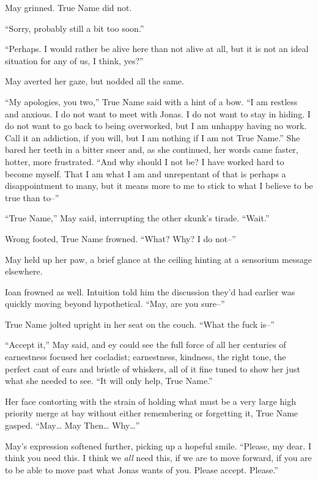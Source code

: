 May grinned. True Name did not.

``Sorry, probably still a bit too soon.''

``Perhaps. I would rather be alive here than not alive at all, but it is not an ideal situation for any of us, I think, yes?''

May averted her gaze, but nodded all the same.

``My apologies, you two,'' True Name said with a hint of a bow. ``I am restless and anxious. I do not want to meet with Jonas. I do not want to stay in hiding. I do not want to go back to being overworked, but I am unhappy having no work. Call it an addiction, if you will, but I am nothing if I am not True Name.'' She bared her teeth in a bitter sneer and, as she continued, her words came faster, hotter, more frustrated. ``And why should I not be? I have worked hard to become myself. That I am what I am and unrepentant of that is perhaps a disappointment to many, but it means more to me to stick to what I believe to be true than to--''

``True Name,'' May said, interrupting the other skunk's tirade. ``Wait.''

Wrong footed, True Name frowned. ``What? Why? I do not--''

May held up her paw, a brief glance at the ceiling hinting at a sensorium message elsewhere.

Ioan frowned as well. Intuition told him the discussion they'd had earlier was quickly moving beyond hypothetical. ``May, are you sure--''

True Name jolted upright in her seat on the couch. ``What the fuck is--''

``Accept it,'' May said, and ey could see the full force of all her centuries of earnestness focused her cocladist; earnestness, kindness, the right tone, the perfect cant of ears and bristle of whiskers, all of it fine tuned to show her just what she needed to see. ``It will only help, True Name.''

Her face contorting with the strain of holding what must be a very large high priority merge at bay without either remembering or forgetting it, True Name gasped. ``May\ldots{} May Then\ldots{} Why\ldots{}''

May's expression softened further, picking up a hopeful smile. ``Please, my dear. I think you need this. I think we \emph{all} need this, if we are to move forward, if you are to be able to move past what Jonas wants of you. Please accept. Please.''

